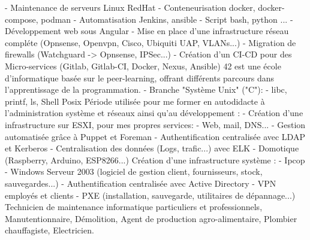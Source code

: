 \documentclass[
	a4paper,
]{FortySecondsCV/fortysecondscv}
\begin{document}
\makefrontsidebar
{}
\begin{cvtable}[3]
 	{
  		\tabto{2mm}- Maintenance de serveurs Linux RedHat
    		\tabto{2mm}- Conteneurisation docker, docker-compose, podman
      		\tabto{2mm}- Automatisation Jenkins, ansible
		\tabto{2mm}- Script bash, python
	}
 	{...} 
		{
			\tabto{2mm}- Développement web sous Angular
			\tabto{2mm}- Mise en place  d'une infrastructure réseau compléte (Opnsense, Openvpn, Cisco, Ubiquiti UAP, VLANs...)
			\tabto{2mm}- Migration de firewalls (Watchguard -> Opnsense, IPSec...)
			\tabto{2mm}- Création d'un CI-CD pour des Micro-services (Gitlab, Gitlab-CI, Docker, Nexus, Ansible)
		}
	{
	42 est une école d'informatique basée sur le peer-learning, offrant différents parcours dans l'apprentissage de la programmation.
		\tabto{2mm}- Branche "Système Unix" ("C"):
   			\tabto{4mm}- libc, printf, ls, Shell Posix
	}
	{
		Période utilisée pour me former en autodidacte à l'administration système et réseaux ainsi qu'au développement :
		\tabto{2mm}- Création d'une infrastructure sur ESXI, pour mes propres services:
			\tabto{4mm}- Web, mail, DNS...
			\tabto{4mm}- Gestion automatisée grâce à Puppet et Foreman
			\tabto{4mm}- Authentification centralisée avec LDAP et Kerberos
			\tabto{4mm}- Centralisation des données (Logs, trafic...) avec ELK
		\tabto{2mm}- Domotique (Raspberry, Arduino, ESP8266...)
	}
	{
		Création d'une infrastructure système :
			\tabto{2mm}- Ipcop
			\tabto{2mm}- Windows Serveur 2003 (logiciel de gestion client, fournisseurs, stock, sauvegardes...)
			\tabto{2mm}- Authentification centralisée avec Active Directory
			\tabto{2mm}- VPN employés et clients
			\tabto{2mm}- PXE (installation, sauvegarde, utilitaires de dépannage...)
	}
	{
		Technicien de maintenance informatique particuliers et professionnels, Manutentionnaire, Démolition, Agent de production agro-alimentaire, Plombier chauffagiste, Electricien.
	}
	{ }
\end{cvtable}
\end{document}
